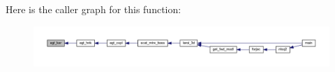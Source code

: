 Here is the caller graph for this function\+:\nopagebreak
\begin{figure}[H]
\begin{center}
\leavevmode
\includegraphics[width=350pt]{Leroi_8f90_ad8346887f578fa81508d64ff7308bd70_icgraph}
\end{center}
\end{figure}
\mbox{\label{Leroi_8f90_a7acbe12b71ec5be34d994fc6743480c8}} 
